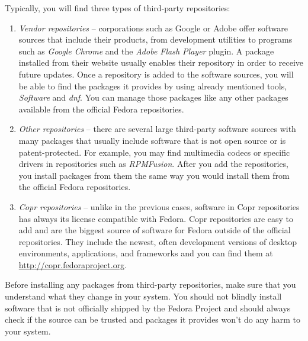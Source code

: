 Typically, you will find three types of third-party repositories:
\begin{enumerate}
\item\emph{Vendor repositories} -- corporations such as Google or Adobe offer software sources that include their products, from development utilities to programs such as \emph{Google Chrome} and the \emph{Adobe Flash Player} plugin. A package installed from their website usually enables their repository in order to receive future updates. Once a repository is added to the software sources, you will be able to find the packages it provides by using already mentioned tools, \emph{Software} and \emph{dnf}. You can manage those packages like any other packages available from the official Fedora repositories.

\item\emph{Other repositories} -- there are several large third-party software sources with many packages that usually include software that is not open source or is patent-protected. For example, you may find multimedia codecs or specific drivers in repositories such as \emph{RPMFusion}. After you add the repositories, you install packages from them the same way you would install them from the official Fedora repositories.

\item\emph{Copr repositories} -- unlike in the previous cases, software in Copr repositories has always its license compatible with Fedora. Copr repositories are easy to add and are the biggest source of software for Fedora outside of the official repositories. They include the newest, often development versions of desktop environments, applications, and frameworks and you can find them at \url{http://copr.fedoraproject.org}.
\end{enumerate}

Before installing any packages from third-party repositories, make sure that you understand what they change in your system. You should not blindly install software that is not officially shipped by the Fedora Project and should always check if the source can be trusted and packages it provides won't do any harm to your system.

\endinput

